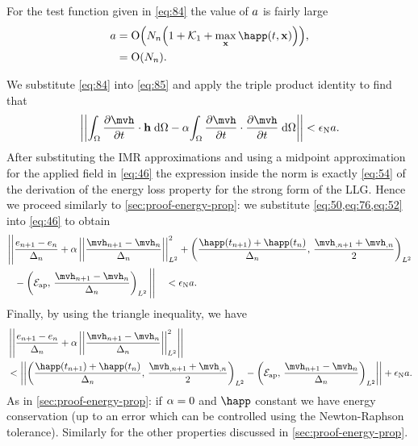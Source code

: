 {For the test function given in \cref{eq:84} the value of $a$ is fairly large
\begin{equation}
  \begin{aligned}
    a &= \order{N_n \bigb{1 + \kone + \max_{\xv} \happ(t, \xv)} }, \\
    &= \order{N_n}.
  \end{aligned}
\end{equation}


We substitute \cref{eq:84} into \cref{eq:85} and apply the triple product identity to find that
\begin{equation}
  \norm{\intd{\dmdth \cdot \hv} - \dampc \intd{\dmdth \cdot \dmdth}} < \ntol \sumbasiscoeff.
  \label{eq:46}
\end{equation}
After substituting the IMR approximations and using a midpoint approximation for the applied field in \cref{eq:46} the expression inside the norm is exactly \cref{eq:54} of the derivation of the energy loss property for the strong form of the LLG.
Hence we proceed similarly to \cref{sec:proof-energy-prop}: we substitute  \cref{eq:50,eq:76,eq:52} into \cref{eq:46} to obtain
\begin{equation}
  \begin{aligned}
    \Bigg|\Bigg| &\frac{\e_{n+1} - \e_n}{\dtn} + \dampc \ltnorm{\frac{\mvh_{n+1} - \mvh_n}{\dtn}}^2 +
      \ltip{\frac{\happ(t_{n+1}) +\happ(t_n)}{\dtn}}{\frac{\mvh_{,n+1} +
          \mvh_{,n}}{2}} \\
      &- \ltip{\happerror}{\frac{\mvh_{n+1} - \mvh_n}{\dtn}} \Bigg|\Bigg| \quad < \ntol \sumbasiscoeff.
  \end{aligned}
\end{equation}
Finally, by using the triangle inequality, we have
\begin{equation}
  \begin{aligned}
    &\norm{ \frac{\e_{n+1} - \e_n}{\dtn} + \dampc \ltnorm{\frac{\mvh_{n+1} - \mvh_n}{\dtn}}^2 } \\
    &< \norm{\ltip{\frac{\happ(t_{n+1}) + \happ(t_n)}{\dtn}}{\frac{\mvh_{,n+1} + \mvh_{,n}}{2}} - \ltip{\happerror}{\frac{\mvh_{n+1} - \mvh_n}{\dtn}} }
  + \ntol \sumbasiscoeff.
  \label{eq:86}
  \end{aligned}
\end{equation}
As in \cref{sec:proof-energy-prop}: if $\alpha = 0$ and $\happ$ constant we have energy conservation (up to an error which can be controlled using the Newton-Raphson tolerance). Similarly for the other properties discussed in \cref{sec:proof-energy-prop}.

}
